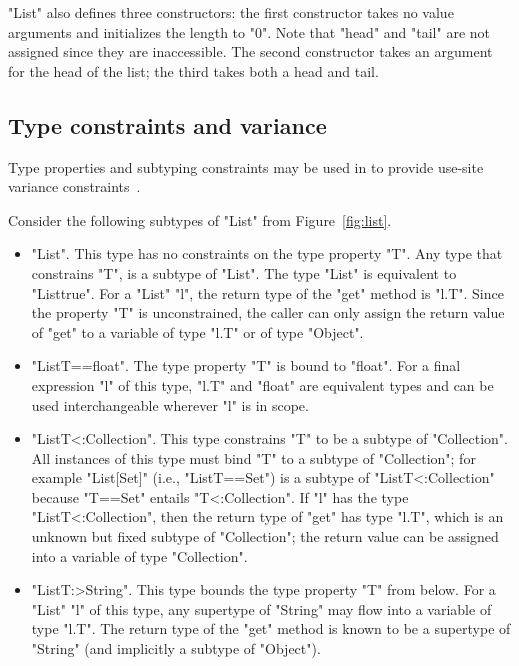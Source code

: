 \xcd"List" also defines three constructors: the first
constructor takes no value arguments and initializes
the length to \xcd"0".  Note that \xcd"head" and \xcd"tail" are
not assigned since they are inaccessible.
The second constructor takes an argument for the head of the
list; the third takes both a head and tail.

\subsection{Type constraints and variance}
\label{sec:variance}

Type properties and subtyping constraints may be used in \Xten{} to 
provide use-site variance
constraints~\cite{variant-parametric-types}.

Consider the following subtypes  of \xcd"List" from
Figure~\ref{fig:list}.
\begin{itemize}
\item \xcd"List".  This type has no constraints on the type
property \xcd"T".
Any type that constrains \xcd"T",
is a subtype of \xcd"List".  The type \xcd"List" is equivalent to
\xcd"List{true}".
%
For a \xcd"List" \xcd"l", the return type of the \xcd"get" method
is \xcd"l.T".
Since the property \xcd"T" is unconstrained,
the caller can only assign the return value of \xcd"get"
to a variable of type \xcd"l.T" or of type \xcd"Object".

\item \xcd"List{T==float}".
The type property \xcd"T" is bound to \xcd"float".
For a final expression \xcd"l" of this type,
\xcd"l.T" and \xcd"float" are equivalent types and can be used
interchangeable wherever \xcd"l" is in scope.

\item \xcd"List{T<:Collection}".
This type constrains \xcd"T" to be a subtype of \xcd"Collection".
All instances of this type must bind \xcd"T" to a subtype of
\xcd"Collection"; for example \xcd"List[Set]" (i.e.,
\xcd"List{T==Set}") is a subtype of
\xcd"List{T<:Collection}" because \xcd"T==Set" entails
\xcd"T<:Collection".
%
If \xcd"l" has the type \xcd"List{T<:Collection}",
then the return type of \xcd"get" has type \xcd"l.T", which is an unknown but
fixed subtype of \xcd"Collection"; the return value can be
assigned into a variable of type \xcd"Collection".

\item \xcd"List{T:>String}".  This type bounds the type property
\xcd"T"
from below.  For a \xcd"List" \xcd"l" of this type, any
supertype of \xcd"String" may flow into a variable of type \xcd"l.T".
The return type of the \xcd"get"
method is known to be a
supertype of \xcd"String" (and implicitly a subtype of \xcd"Object").
\end{itemize}

